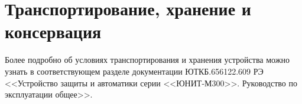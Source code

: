 
\vspace{5mm}
\color{uniblue}\section[Транспортирование, хранение и консервация]{Транспортирование, хранение и консервация}\label{sec:trans}
\color{black}


Более подробно об условиях транспортирования и хранения устройства можно узнать в соответствующем разделе документации ЮТКБ.656122.609 РЭ <<Устройство защиты и автоматики серии <<ЮНИТ-М300>>. Руководство по эксплуатации общее>>. 
